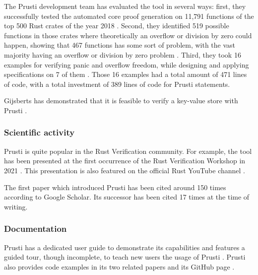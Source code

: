The Prusti development team has evaluated the tool in several ways: first, they successfully tested the automated core proof generation on 11,791 functions of the top 500 Rust crates of the year 2018 \cite{astrauskas_leveraging_2019}. Second, they identified 519 possible functions in those crates where theoretically an overflow or division by zero could happen, showing that 467 functions has some sort of problem, with the vast majority having an overflow or division by zero problem \cite{astrauskas_leveraging_2019}. Third, they took 16 examples for verifying panic and overflow freedom, while designing and applying specifications on 7 of them \cite{astrauskas_leveraging_2019}. Those 16 examples had a total amount of 471 lines of code, with a total investment of 389 lines of code for Prusti statements.

Gijsberts has demonstrated that it is feasible to verify a key-value store with Prusti \cite{stef_gijsberts_prusti_2023}.

\subsubsection{Scientific activity}
Prusti is quite popular in the Rust Verification community. For example, the tool has been presented at the first occurrence of the Rust Verification Workshop in 2021 \cite{peter_muller_eth_zurich_rust_2021}. This presentation is also featured on the official Rust YouTube channel \cite{alex_summers_prusti_2021}.

The first paper \cite{astrauskas_leveraging_2019} which introduced Prusti has been cited around 150 times according to Google Scholar. Its successor \cite{deshmukh_prusti_2022} has been cited 17 times at the time of writing.

\subsubsection{Documentation}
Prusti has a dedicated user guide to demonstrate its capabilities and features a guided tour, though incomplete, to teach new users the usage of Prusti \cite{prusti_user_guide_introduction_2023}. Prusti also provides code examples in its two related papers \cite{deshmukh_prusti_2022, astrauskas_leveraging_2019} and its GitHub page \cite{eth_zurich_viperprojectprusti-dev_2023}.